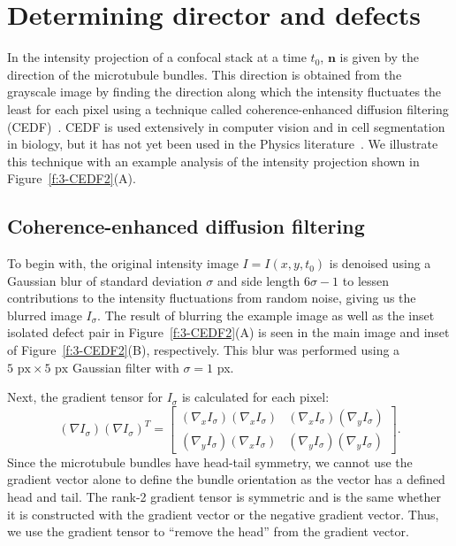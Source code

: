 \section{Determining director and defects}
In the intensity projection of a confocal stack at a time $t_0$, $\mathbf{n}$ is given by the direction of the microtubule bundles.
This direction is obtained from the grayscale image by finding the direction along which the intensity fluctuates the least for each pixel using a technique called coherence-enhanced diffusion filtering (CEDF)~\cite{RN30}.
CEDF is used extensively in computer vision and in cell segmentation in biology, but it has not yet been used in the Physics literature~\cite{RN137}.
We illustrate this technique with an example analysis of the intensity projection shown in Figure~\ref{f:3-CEDF2}(A).


\subsection{Coherence-enhanced diffusion filtering}
To begin with, the original intensity image $I = I(x,y,t_0)$ is denoised using a Gaussian blur of standard deviation $\sigma$ and side length $6 \sigma -1$ to lessen contributions to the intensity fluctuations from random noise, giving us the blurred image $I_{\sigma}$.
The result of blurring the example image as well as the inset isolated defect pair in Figure~\ref{f:3-CEDF2}(A) is seen in the main image and inset of Figure~\ref{f:3-CEDF2}(B), respectively.
This blur was performed using a $5 \textrm{ px} \times 5 \textrm{ px}$ Gaussian filter with $\sigma= 1$ px.

Next, the gradient tensor for $I_{\sigma}$ is calculated for each pixel:
\begin{equation}
(\nabla I_{\sigma})(\nabla I_{\sigma})^T =
\begin{bmatrix}
(\nabla_x I_{\sigma})(\nabla_x I_{\sigma}) & (\nabla_x I_{\sigma})(\nabla_y I_{\sigma}) \\
(\nabla_y I_{\sigma})(\nabla_x I_{\sigma}) & (\nabla_y I_{\sigma})(\nabla_y I_{\sigma})
\end{bmatrix}.
\end{equation}
Since the microtubule bundles have head-tail symmetry, we cannot use the gradient vector alone to define the bundle orientation as the vector has a defined head and tail.
The rank-2 gradient tensor is symmetric and is the same whether it is constructed with the gradient vector or the negative gradient vector.
Thus, we use the gradient tensor to ``remove the head'' from the gradient vector.

